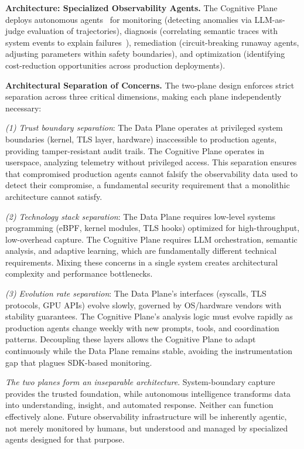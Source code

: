 \documentclass[sigplan,screen,9pt]{acmart}
\begin{document}
\textbf{Architecture: Specialized Observability Agents.} The Cognitive Plane deploys autonomous agents~\cite{Rombaut2025Watson,Kim2025AgenticInterp,Dong2024AgentOps} for monitoring (detecting anomalies via LLM-as-judge evaluation of trajectories), diagnosis (correlating semantic traces with system events to explain failures~\cite{Moshkovich2025Pipeline}), remediation (circuit-breaking runaway agents, adjusting parameters within safety boundaries), and optimization (identifying cost-reduction opportunities across production deployments).

\textbf{Architectural Separation of Concerns.} The two-plane design enforces strict separation across three critical dimensions, making each plane independently necessary:

\emph{(1) Trust boundary separation}: The Data Plane operates at privileged system boundaries (kernel, TLS layer, hardware) inaccessible to production agents, providing tamper-resistant audit trails. The Cognitive Plane operates in userspace, analyzing telemetry without privileged access. This separation ensures that compromised production agents cannot falsify the observability data used to detect their compromise, a fundamental security requirement that a monolithic architecture cannot satisfy.

\emph{(2) Technology stack separation}: The Data Plane requires low-level systems programming (eBPF, kernel modules, TLS hooks) optimized for high-throughput, low-overhead capture. The Cognitive Plane requires LLM orchestration, semantic analysis, and adaptive learning, which are fundamentally different technical requirements. Mixing these concerns in a single system creates architectural complexity and performance bottlenecks.

\emph{(3) Evolution rate separation}: The Data Plane's interfaces (syscalls, TLS protocols, GPU APIs) evolve slowly, governed by OS/hardware vendors with stability guarantees. The Cognitive Plane's analysis logic must evolve rapidly as production agents change weekly with new prompts, tools, and coordination patterns. Decoupling these layers allows the Cognitive Plane to adapt continuously while the Data Plane remains stable, avoiding the instrumentation gap that plagues SDK-based monitoring.

\emph{The two planes form an inseparable architecture}. System-boundary capture provides the trusted foundation, while autonomous intelligence transforms data into understanding, insight, and automated response. Neither can function effectively alone. Future observability infrastructure will be inherently agentic, not merely monitored by humans, but understood and managed by specialized agents designed for that purpose.
\end{document}
